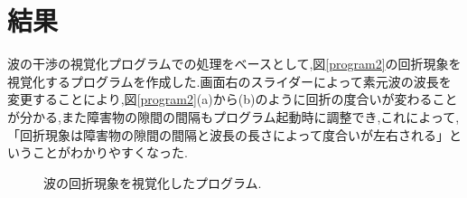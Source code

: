 \documentclass[a4j,twocolumn,uplatex]{jarticle}
\begin{document}
\section{結果}
波の干渉の視覚化プログラムでの処理をベースとして,図\ref{program2}の回折現象を視覚化するプログラムを作成した.画面右のスライダーによって素元波の波長を変更することにより,図\ref{program2}(a)から(b)のように回折の度合いが変わることが分かる,また障害物の隙間の間隔もプログラム起動時に調整でき,これによって,「回折現象は障害物の隙間の間隔と波長の長さによって度合いが左右される」ということがわかりやすくなった.
\begin{figure}[H]
\caption{{\footnotesize 波の回折現象を視覚化したプログラム.}}
\label{fig:program2}
\end{figure}
\vspace{-4mm}
\end{document}
